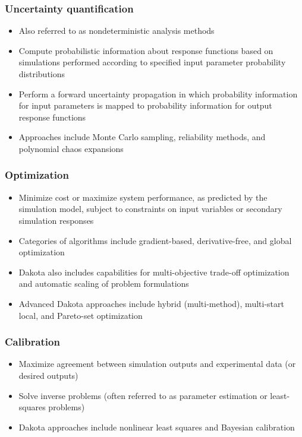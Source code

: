 \documentclass[t]{beamer}
\begin{document}

\begin{frame}
  \frametitle{Uncertainty quantification}
  \begin{itemize}
    \item Also referred to as nondeterministic analysis methods
    \item Compute probabilistic information about response functions based on
          simulations performed according to specified input parameter
          probability distributions
    \item Perform a forward uncertainty propagation in which probability
          information for input parameters is mapped to probability information
          for output response functions
    \item Approaches include Monte Carlo sampling, reliability methods, and
          polynomial chaos expansions
  \end{itemize}
\end{frame}


\begin{frame}
  \frametitle{Optimization}
  \begin{itemize}
    \item Minimize cost or maximize system performance, as predicted by the
          simulation model, subject to constraints on input variables or
          secondary simulation responses
    \item Categories of algorithms include gradient-based, derivative-free, and
          global optimization
    \item Dakota also includes capabilities for multi-objective trade-off
          optimization and automatic scaling of problem formulations
    \item Advanced Dakota approaches include hybrid (multi-method), multi-start
          local, and Pareto-set optimization
  \end{itemize}
\end{frame}


\begin{frame}
  \frametitle{Calibration}
  \begin{itemize}
    \item Maximize agreement between simulation outputs and experimental data
          (or desired outputs)
    \item Solve inverse problems (often referred to as parameter estimation or
          least-squares problems)
    \item Dakota approaches include nonlinear least squares and Bayesian
          calibration
  \end{itemize}
\end{frame}
\end{document}
